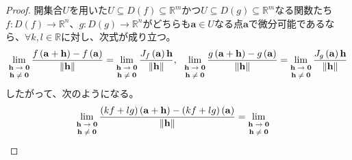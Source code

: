 \documentclass[dvipdfmx]{jsarticle}
\begin{document}
\begin{proof}
開集合$U$を用いた$U \subseteq D(f) \subseteq \mathbb{R}^{m}$かつ$U \subseteq D(g) \subseteq \mathbb{R}^{m}$なる関数たち$f:D(f) \rightarrow \mathbb{R}^{n}$、$g:D(g) \rightarrow \mathbb{R}^{n}$がどちらも$\mathbf{a} \in U$なる点$\mathbf{a}$で微分可能であるなら、$\forall k,l \in \mathbb{R}$に対し、次式が成り立つ。
\begin{align*}
\lim_{\scriptsize \begin{matrix}
\mathbf{h} \rightarrow \mathbf{0} \\
\mathbf{h} \neq \mathbf{0} \\
\end{matrix}}\frac{f\left( \mathbf{a} + \mathbf{h} \right) - f\left( \mathbf{a} \right)}{\left\| \mathbf{h} \right\|} = \lim_{\scriptsize \begin{matrix}
\mathbf{h} \rightarrow \mathbf{0} \\
\mathbf{h} \neq \mathbf{0} \\
\end{matrix}}\frac{J_{f}\left( \mathbf{a} \right)\mathbf{h}}{\left\| \mathbf{h} \right\|},\ \ \lim_{\scriptsize \begin{matrix}
\mathbf{h} \rightarrow \mathbf{0} \\
\mathbf{h} \neq \mathbf{0} \\
\end{matrix}}\frac{g\left( \mathbf{a} + \mathbf{h} \right) - g\left( \mathbf{a} \right)}{\left\| \mathbf{h} \right\|} = \lim_{\scriptsize \begin{matrix}
\mathbf{h} \rightarrow \mathbf{0} \\
\mathbf{h} \neq \mathbf{0} \\
\end{matrix}}\frac{J_{g}\left( \mathbf{a} \right)\mathbf{h}}{\left\| \mathbf{h} \right\|}
\end{align*}
したがって、次のようになる。
\begin{align*}
\lim_{\scriptsize \begin{matrix}
\mathbf{h} \rightarrow \mathbf{0} \\
\mathbf{h} \neq \mathbf{0} \\
\end{matrix}}\frac{(kf + lg)\left( \mathbf{a} + \mathbf{h} \right) - (kf + lg)\left( \mathbf{a} \right)}{\left\| \mathbf{h} \right\|} &= \lim_{\scriptsize \begin{matrix}
\mathbf{h} \rightarrow \mathbf{0} \\
\mathbf{h} \neq \mathbf{0} \\

\end{matrix}}
\end{align*}
\end{proof}
\end{document}
